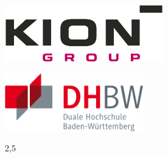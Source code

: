 \begin{titlepage}
    \begin{minipage}[t][2.5cm]{0.4\linewidth}
        \raggedright
        \includegraphics[height=2.5cm]{images/company}
    \end{minipage}
    \hfill
    \begin{minipage}[t][2.5cm]{0.4\linewidth}
        \raggedleft
        \includegraphics[height=2.5cm]{images/dhbw}
    \end{minipage}

    \begin{center}
        \vspace{0.5cm}
        \begin{spacing}{2,5}
        {\huge\textbf \mythesisTitle }
            \\
        \end{spacing}

        \vspace*{15mm}
        {\LARGE\textbf \mythesis }\\
        \ifdefined\myphase
        \myphase\\
        \fi

        \vspace*{10mm}
        \langfromthecourseofstudies\ \mymajor\\

        \vspace*{5mm}
        \langatdhbw\ \mydhbw\\
        \ifdefined\mycampus
        \langcampus\ \mycampus\\
        \fi

        \vspace*{15mm}
        \langby\\

        \vspace*{5mm}
        {\large\textbf \myauthor}\\


\end{center}
\end{titlepage}
